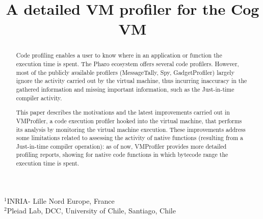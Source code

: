 \documentclass[10pt,nonatbib]{sigplanconf}
\newcommand{\Title}{A detailed VM profiler for the Cog VM}
\newcommand{\Authors}{Sophie Kaleba, Cl\'ement B\'era, Alexandre Bergel$^3$\\[2 ex]
$^3$Pleiad Lab, DCC, University of Chile}
\begin{document}
\setlength{\pdfpageheight}{\paperheight}
\setlength{\pdfpagewidth}{\paperwidth}



\title{\Title}


           {$^1$INRIA- Lille Nord Europe, France\\
             $^2$Pleiad Lab, DCC, University of Chile, Santiago, Chile}
           {}


\maketitle

\begin{abstract}

Code profiling enables a user to know where in an application or function the execution time is spent. The Pharo ecosystem offers several code profilers. However, most of the publicly available profilers (MessageTally, Spy, GadgetProfiler) largely ignore the activity carried out by the virtual machine, thus incurring inaccuracy in the gathered information and missing important information, such as the Just-in-time compiler activity.

This paper describes the motivations and the latest improvements carried out in VMProfiler, a code execution profiler hooked into the virtual machine, that performs its analysis by monitoring the virtual machine execution. These improvements address some limitations related to assessing the activity of native functions (resulting from a Just-in-time compiler operation): as of now, VMProfiler provides more detailed profiling reports, showing for native code functions in which bytecode range the execution time is spent.

%
%

\end{abstract}
\end{document}
